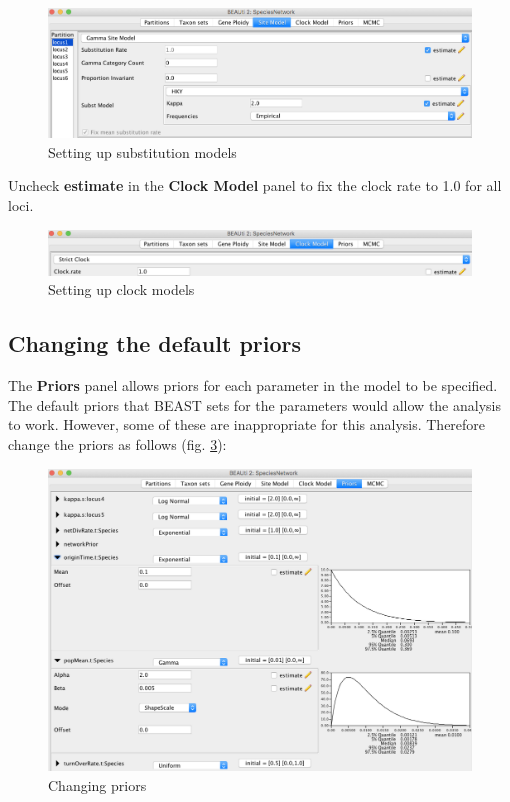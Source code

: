 \documentclass[11pt]{article}
\begin{document}
\begin{figure}[h]
\center
\includegraphics[width=1.0\textwidth]{figs/fig5_sitemodel}
\caption{Setting up substitution models}
\label{fig_sitemodel}
\end{figure}

Uncheck \textbf{estimate} in the \textbf{Clock Model} panel to fix the clock rate to 1.0 for all loci.
\begin{figure}[h]
\center
\includegraphics[width=1.0\textwidth]{figs/fig6_clockmodel}
\caption{Setting up clock models}
\label{fig_clockmodel}
\end{figure}

\subsection*{Changing the default priors}

The \textbf{Priors} panel allows priors for each parameter in the model to be specified. The default priors that BEAST sets for the parameters would allow the analysis to work. However, some of these are inappropriate for this analysis. Therefore change the priors as follows (fig. \ref{fig_priors}):

\begin{figure}[h]
\center
\includegraphics[width=1.0\textwidth]{figs/fig7_priors}
\caption{Changing priors}
\label{fig_priors}
\end{figure}
\end{document}
